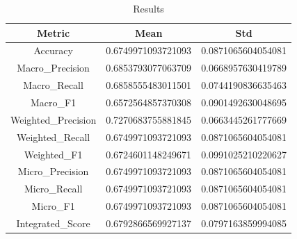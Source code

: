 \begin{table}[htbp]
\centering
\caption{Results}
\label{tab:csv}
\small
\setlength{\tabcolsep}{4pt}
\begin{tabular}{|c|c|c|}
\hline
Metric & Mean & Std \\
\hline
Accuracy & 0.6749971093721093 & 0.0871065604054081 \\
Macro_Precision & 0.6853793077063709 & 0.0668957630419789 \\
Macro_Recall & 0.6858555483011501 & 0.0744190836635463 \\
Macro_F1 & 0.6572564857370308 & 0.0901492630048695 \\
Weighted_Precision & 0.7270683755881845 & 0.0663445261777669 \\
Weighted_Recall & 0.6749971093721093 & 0.0871065604054081 \\
Weighted_F1 & 0.6724601148249671 & 0.0991025210220627 \\
Micro_Precision & 0.6749971093721093 & 0.0871065604054081 \\
Micro_Recall & 0.6749971093721093 & 0.0871065604054081 \\
Micro_F1 & 0.6749971093721093 & 0.0871065604054081 \\
Integrated_Score & 0.6792866569927137 & 0.0797163859994085 \\
\hline
\end{tabular}
\end{table}